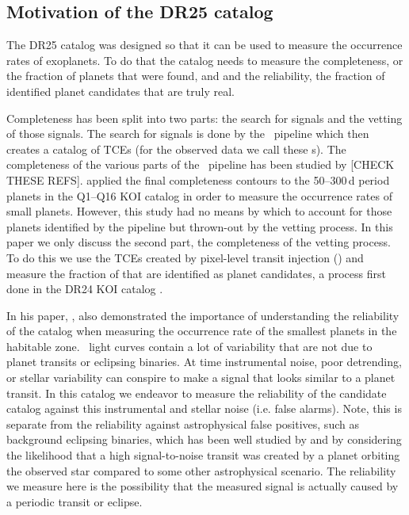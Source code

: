 \subsection{Motivation of the DR25 catalog}

The DR25 catalog was designed so that it can be used to measure the occurrence rates of exoplanets. To do that the catalog needs to measure the completeness, or the fraction of planets that were found, and and the reliability, the fraction of identified planet candidates that are truly real.  

Completeness has been split into two parts: the search for signals and the vetting of those signals. The search for signals is done by the \Kepler\ pipeline which then creates a catalog of TCEs (for the observed data we call these \opstce s).  The completeness of the various parts of the \Kepler\ pipeline has been studied by \citep{Christiansen2015b,Christiansen2013a}[CHECK THESE REFS]. \citet{Burke2015} applied the final completeness contours to the 50--300\,d period planets in the Q1--Q16 KOI catalog \citep{Mullally2015cat} in order to measure the occurrence rates of small planets. However, this study had no means by which to account for those planets identified by the pipeline but thrown-out by the vetting process.   In this paper we only discuss the second part, the completeness of the vetting process. To do this we use the TCEs created by pixel-level transit injection (\injtce) and measure the fraction of that are identified as planet candidates, a process first done in the DR24 KOI catalog \citet{Coughlin2016}.

In his paper, \citet{Burke2015}, also demonstrated the importance of understanding the reliability of the catalog when measuring the occurrence rate of the smallest planets in the habitable zone.  \Kepler\ light curves contain a lot of variability that are not due to planet transits or eclipsing binaries.  At time instrumental noise, poor detrending, or stellar variability can conspire to make a signal that looks similar to a planet transit. In this catalog we endeavor to measure the reliability of the candidate catalog against this instrumental and stellar noise (i.e. false alarms).  Note, this is separate from the reliability against astrophysical false positives, such as background eclipsing binaries, which has been well studied by \citep{Morton2016} and \citet{Torres2012} by considering the likelihood that a high signal-to-noise transit was created by a planet orbiting the observed star compared to some other astrophysical scenario.  The reliability we measure here is the possibility that the measured signal is actually caused by a periodic transit or eclipse.

